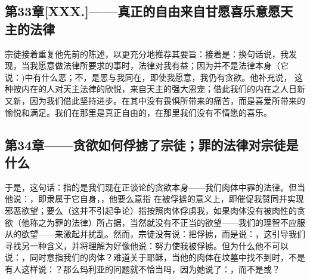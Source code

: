 
\subsection{第33章[XXX.]——真正的自由来自甘愿喜乐意愿天主的法律}

宗徒接着重复他先前的陈述，以更充分地推荐其要旨：接着是：换句话说，我发现，当我愿意做法律所要求的事时，法律对我有益；因为并不是法律本身（它说：)中有什么恶；不，是恶与我同在，即使我愿意，我仍有贪欲。他补充说， 这种按内在的人对天主法律的欣悦，来自天主的强大恩宠；借此我们的内在之人日新又新，因为我们借此坚持进步。在其中没有畏惧所带来的痛苦，而是喜爱所带来的愉悦和满足。我们在那里是真正自由的，在那里我们没有不情愿的喜乐。\par


\subsection{第34章——贪欲如何俘掳了宗徒；罪的法律对宗徒是什么}

于是，这句话：指的是我们现在正谈论的贪欲本身——我们肉体中罪的法律。但当他说：，即隶属于它自身，，他要么意指 在被俘掳的意义上，即催促我赞同并实现邪恶欲望；要么（这并不引起争论）指按照肉体俘虏我，如果肉体没有被肉性的贪欲（他称之为罪的法律）所占据，当然就没有不正当的欲望——我们的理智不应服从的欲望——来激起并扰乱。然而，宗徒没有说：把俘掳，而是说：，这引导我们寻找另一种含义，并将理解为好像他说：努力使我被俘掳。但为什么他不可以说：，同时意指我们的肉体？难道关于耶稣，当他的肉体在坟墓中找不到时，不是有人这样说：？那么玛利亚的问题就不恰当吗，因为她说了：，而不是或？\par

